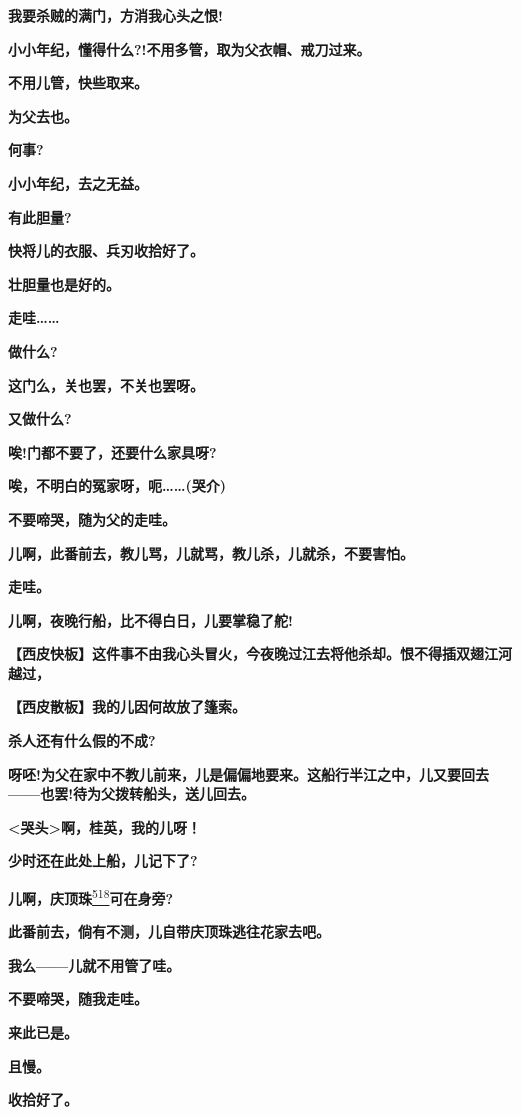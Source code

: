 \textbf{我要杀贼的满门，方消我心头之恨!}

\textbf{小小年纪，懂得什么?!不用多管，取为父衣帽、戒刀过来。}

\textbf{不用儿管，快些取来。}

\textbf{为父去也。}

\textbf{何事?}

\textbf{小小年纪，去之无益。}

\textbf{有此胆量?}

\textbf{快将儿的衣服、兵刃收拾好了。}

\textbf{壮胆量也是好的。}

\textbf{走哇\ldots{}\ldots{}}

\textbf{做什么?}

\textbf{这门么，关也罢，不关也罢呀。}

\textbf{又做什么?}

\textbf{唉!门都不要了，还要什么家具呀?}

\textbf{唉，不明白的冤家呀，呃\ldots{}\ldots{}(哭介)}

\textbf{不要啼哭，随为父的走哇。}

\textbf{儿啊，此番前去，教儿骂，儿就骂，教儿杀，儿就杀，不要害怕。}

\textbf{走哇。}

\textbf{儿啊，夜晚行船，比不得白日，儿要掌稳了舵!}

\textbf{【西皮快板】这件事不由我心头冒火，今夜晚过江去将他杀却。恨不得插双翅江河越过，}

\textbf{【西皮散板】我的儿因何故放了篷索。}

\textbf{杀人还有什么假的不成?}

\textbf{呀呸!为父在家中不教儿前来，儿是偏偏地要来。这船行半江之中，儿又要回去------也罢!待为父拨转船头，送儿回去。}

\textbf{\textless{}哭头\textgreater{}啊，桂英，我的儿呀！}

\textbf{少时还在此处上船，儿记下了?}

\textbf{儿啊，庆顶珠}\protect\hyperlink{fn518}{\textsuperscript{518}}\textbf{可在身旁?}

\textbf{此番前去，倘有不测，儿自带庆顶珠逃往花家去吧。}

\textbf{我么------儿就不用管了哇。}

\textbf{不要啼哭，随我走哇。}

\textbf{来此已是。}

\textbf{且慢。}

\textbf{收拾好了。}

